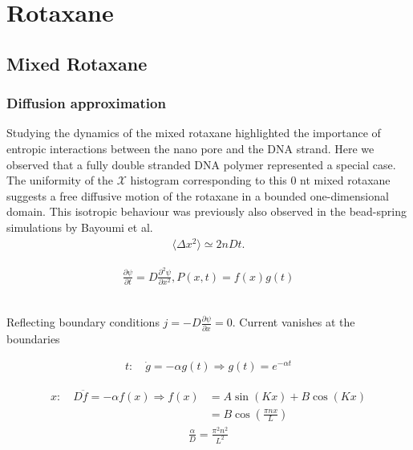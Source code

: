 \chapter{Rotaxane}
\section{Mixed Rotaxane}

\subsection{Diffusion approximation}

Studying the dynamics of the mixed rotaxane highlighted the importance of entropic
interactions between the nano pore and the DNA strand. Here we observed that a fully
double stranded DNA polymer represented a special case. The uniformity of the
$\mathcal{X}$ histogram corresponding to this 0 nt mixed rotaxane suggests a free
diffusive motion of the rotaxane in a bounded one-dimensional domain. This isotropic
behaviour was previously also observed in the bead-spring simulations by Bayoumi et
al. \cite{EntropicPiston}\\

\begin{align*}
  \langle \Delta x^2 \rangle \simeq 2n Dt.
\end{align*}


\begin{align*}
  \frac{\partial \psi}{\partial t} =  D \frac{\partial^2 \psi}{\partial x^2}, P(x,t) =
f(x)g(t)
\end{align*}

\begin{align*}
\end{align*}

Reflecting boundary conditions $j = - D \frac{\partial \psi}{\partial x} = 0$. Current
vanishes at the boundaries

\begin{align*}
t:\quad \dot{g} = - \alpha g(t) \Rightarrow g(t) = e^{-\alpha t}
\end{align*}

\begin{align*}
  x:\quad D \ddot{f} = - \alpha f(x) \Rightarrow f(x) &= A \sin(K x) + B \cos(Kx)\\
  &= B \cos(\frac{\pi n x}{L})
\end{align*}
\begin{align*}
  \frac{\alpha}{D} = \frac{\pi^2 n^2}{L^2}
\end{align*}

